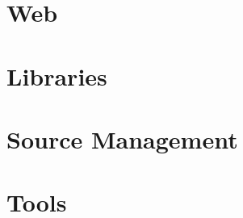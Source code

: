 \documentclass[a4paper,10pt,twoside]{book}
\begin{document}


\part{Web}


\part{Libraries}
 


%




\part{Source Management}

%





\part{Tools}








\printindex
\end{document}
